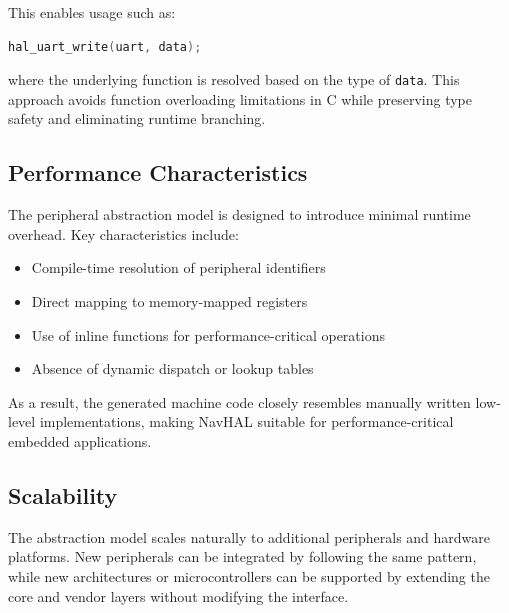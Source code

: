 This enables usage such as:

\begin{lstlisting}[language=C]
hal_uart_write(uart, data);
\end{lstlisting}

where the underlying function is resolved based on the type of \texttt{data}. This approach avoids function overloading limitations in C while preserving type safety and eliminating runtime branching.

\subsection*{Performance Characteristics}

The peripheral abstraction model is designed to introduce minimal runtime overhead. Key characteristics include:

\begin{itemize}
    \item Compile-time resolution of peripheral identifiers
    \item Direct mapping to memory-mapped registers
    \item Use of inline functions for performance-critical operations
    \item Absence of dynamic dispatch or lookup tables
\end{itemize}

As a result, the generated machine code closely resembles manually written low-level implementations, making NavHAL suitable for performance-critical embedded applications.

\subsection*{Scalability}

The abstraction model scales naturally to additional peripherals and hardware platforms. New peripherals can be integrated by following the same pattern, while new architectures or microcontrollers can be supported by extending the core and vendor layers without modifying the interface.